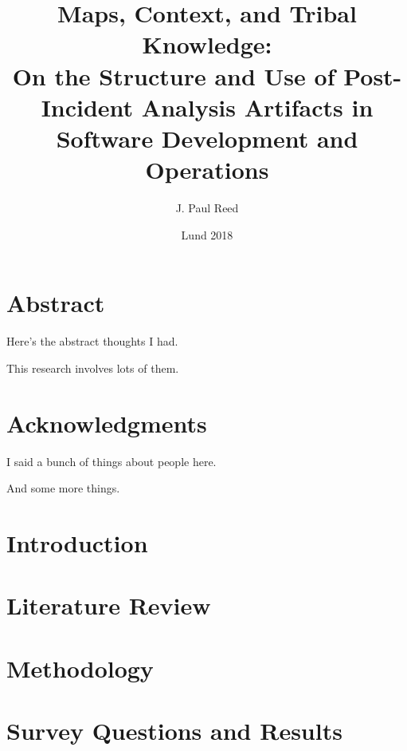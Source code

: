 \documentclass[14pt]{extreport}
\title{
	{Maps, Context, and Tribal Knowledge:\\On the Structure and Use of Post-Incident Analysis Artifacts in Software Development and Operations}\\
}
\author{J. Paul Reed}
\date{Lund 2018}
\begin{document}
\renewcommand{\thepage}{\roman{page}}

\chapter*{Abstract}

Here's the abstract thoughts I had.
\par
\medskip
This research involves lots of them.

\chapter*{Acknowledgments}

I said a bunch of things about people here.
\par
\medskip
And some more things.

\tableofcontents

\listoffigures

\listoftables

\chapter{Introduction}
\setcounter{page}{1}
\renewcommand{\thepage}{\arabic{page}}


\chapter{Literature Review}


\chapter{Methodology}


\pagebreak

\printbibliography[title={References:}]

\appendix
{}

\chapter{Survey Questions and Results}

\end{document}
